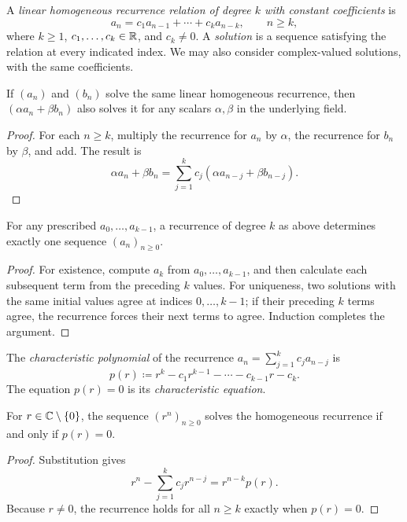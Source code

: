 \documentclass[11pt, oneside]{article}
\begin{document}
\begin{definition}
A \emph{linear homogeneous recurrence relation of degree $k$ with constant coefficients} is
\[
a_n=c_1a_{n-1}+\cdots+c_ka_{n-k}, \qquad n\ge k,
\]
where $k\ge1$, $c_1, \ldots, c_k\in\mathbb{R}$, and $c_k\ne0$. A \emph{solution} is a sequence satisfying the relation at every indicated index. We may also consider complex-valued solutions, with the same coefficients.
\end{definition}
\begin{proposition}\label{prop:linrec}
If $(a_n)$ and $(b_n)$ solve the same linear homogeneous recurrence, then $(\alpha a_n+\beta b_n)$ also solves it for any scalars $\alpha, \beta$ in the underlying field.
\end{proposition}
\begin{proof}
For each $n\ge k$, multiply the recurrence for $a_n$ by $\alpha$, the recurrence for $b_n$ by $\beta$, and add. The result is
\[
\alpha a_n+\beta b_n=\sum_{j=1}^kc_j(\alpha a_{n-j}+\beta b_{n-j}).
\]
\end{proof}
\begin{proposition}\label{prop:unique}
For any prescribed $a_0, \ldots, a_{k-1}$, a recurrence of degree $k$ as above determines exactly one sequence $(a_n)_{n\ge0}$.
\end{proposition}
\begin{proof}
For existence, compute $a_k$ from $a_0, \ldots, a_{k-1}$, and then calculate each subsequent term from the preceding $k$ values. For uniqueness, two solutions with the same initial values agree at indices $0, \ldots, k-1$; if their preceding $k$ terms agree, the recurrence forces their next terms to agree. Induction completes the argument.
\end{proof}

\begin{definition}
The \emph{characteristic polynomial} of the recurrence
$a_n=\displaystyle\sum_{j=1}^kc_ja_{n-j}$ is
\[
p(r)\coloneqq r^k-c_1r^{k-1}-\cdots-c_{k-1}r-c_k.
\]
The equation $p(r)=0$ is its \emph{characteristic equation}.
\end{definition}
\begin{proposition}
For $r\in\mathbb{C}\setminus\{0\}$, the sequence $(r^n)_{n\ge0}$ solves the homogeneous recurrence if and only if $p(r)=0$.
\end{proposition}
\begin{proof}
Substitution gives
\[
r^n-\sum_{j=1}^kc_jr^{n-j}=r^{n-k}p(r).
\]
Because $r\ne0$, the recurrence holds for all $n\ge k$ exactly when $p(r)=0$.
\end{proof}
\end{document}
